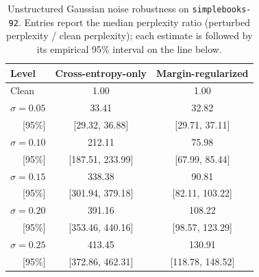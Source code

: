 \documentclass[11pt]{article}
\begin{document}
\begin{table}[H]
\centering
\caption{Unstructured Gaussian noise robustness on \texttt{simplebooks-92}.
Entries report the median perplexity ratio (perturbed perplexity / clean perplexity); each estimate is followed by its empirical 95\% interval on the line below.}
\label{tab:appendix_robustness_simplebooks_gaussian}
\small
\begin{tabular}{lcc}
\toprule
\textbf{Level} & \textbf{Cross-entropy-only} & \textbf{Margin-regularized} \\
\midrule
Clean & 1.00 & 1.00 \\
$\sigma{=}0.05$ & 33.41 & 32.82 \\
\multicolumn{1}{r}{\footnotesize [95\%]} & \footnotesize [29.32, 36.88] & \footnotesize [29.71, 37.11] \\
$\sigma{=}0.10$ & 212.11 & 75.98 \\
\multicolumn{1}{r}{\footnotesize [95\%]} & \footnotesize [187.51, 233.99] & \footnotesize [67.99, 85.44] \\
$\sigma{=}0.15$ & 338.38 & 90.81 \\
\multicolumn{1}{r}{\footnotesize [95\%]} & \footnotesize [301.94, 379.18] & \footnotesize [82.11, 103.22] \\
$\sigma{=}0.20$ & 391.16 & 108.22 \\
\multicolumn{1}{r}{\footnotesize [95\%]} & \footnotesize [353.46, 440.16] & \footnotesize [98.57, 123.29] \\
$\sigma{=}0.25$ & 413.45 & 130.91 \\
\multicolumn{1}{r}{\footnotesize [95\%]} & \footnotesize [372.86, 462.31] & \footnotesize [118.78, 148.52] \\
\bottomrule
\end{tabular}
\end{table}
\end{document}

